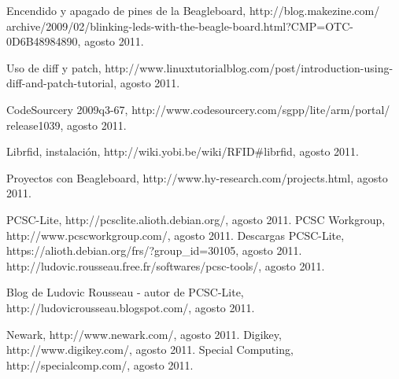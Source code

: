 \begin{thebibliography}{200}
\bibitem{} Encendido y apagado de pines de la Beagleboard, http://blog.makezine.com/\\
archive/2009/02/blinking-leds-with-the-beagle-board.html?CMP=OTC-0D6B48984890, agosto 2011.

\bibitem{} Uso de diff y patch, http://www.linuxtutorialblog.com/post/introduction-using-diff-and-patch-tutorial, agosto 2011.

\bibitem{} CodeSourcery 2009q3-67, http://www.codesourcery.com/sgpp/lite/arm/portal/\\
release1039, agosto 2011.

\bibitem{} Librfid, instalación, http://wiki.yobi.be/wiki/RFID\#librfid, agosto 2011.

\bibitem{} Proyectos con Beagleboard, http://www.hy-research.com/projects.html, agosto 2011.




 PCSC-Lite, http://pcsclite.alioth.debian.org/, agosto 2011.
 PCSC Workgroup, http://www.pcscworkgroup.com/, agosto 2011.
 Descargas PCSC-Lite, https://alioth.debian.org/frs/?group\_id=30105, agosto 2011.
 http://ludovic.rousseau.free.fr/softwares/pcsc-tools/, agosto 2011.

\bibitem{} Blog de Ludovic Rousseau - autor de PCSC-Lite, http://ludovicrousseau.blogspot.com/, agosto 2011.

 Newark, http://www.newark.com/, agosto 2011.
 Digikey, http://www.digikey.com/, agosto 2011.
 Special Computing, http://specialcomp.com/, agosto 2011.
\end{thebibliography}
